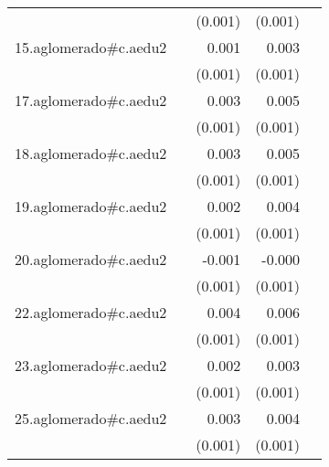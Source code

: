 {\begin{longtable}{l*{4}{D{.}{.}{-1}}}
            &                     &     (0.001)         &     (0.001)         &                     \\
\addlinespace
15.aglomerado#c.aedu2&                     &       0.001         &       0.003\sym{**} &                     \\
            &                     &     (0.001)         &     (0.001)         &                     \\
\addlinespace
17.aglomerado#c.aedu2&                     &       0.003\sym{*}  &       0.005\sym{***}&                     \\
            &                     &     (0.001)         &     (0.001)         &                     \\
\addlinespace
18.aglomerado#c.aedu2&                     &       0.003\sym{*}  &       0.005\sym{***}&                     \\
            &                     &     (0.001)         &     (0.001)         &                     \\
\addlinespace
19.aglomerado#c.aedu2&                     &       0.002         &       0.004\sym{***}&                     \\
            &                     &     (0.001)         &     (0.001)         &                     \\
\addlinespace
20.aglomerado#c.aedu2&                     &      -0.001         &      -0.000         &                     \\
            &                     &     (0.001)         &     (0.001)         &                     \\
\addlinespace
22.aglomerado#c.aedu2&                     &       0.004\sym{**} &       0.006\sym{***}&                     \\
            &                     &     (0.001)         &     (0.001)         &                     \\
\addlinespace
23.aglomerado#c.aedu2&                     &       0.002         &       0.003\sym{***}&                     \\
            &                     &     (0.001)         &     (0.001)         &                     \\
\addlinespace
25.aglomerado#c.aedu2&                     &       0.003\sym{*}  &       0.004\sym{***}&                     \\
            &                     &     (0.001)         &     (0.001)         &                     \\

\end{longtable}}

